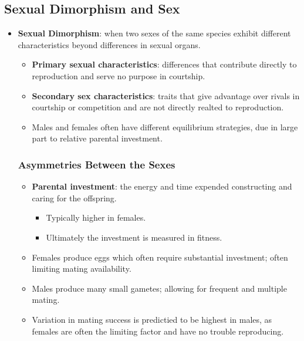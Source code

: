 \documentclass[12pt,a4paper]{article}
\begin{document}
\subsection{Sexual Dimorphism and Sex}
\begin{itemize}
    \item \textbf{Sexual Dimorphism}: when two sexes of the same species exhibit different characteristics beyond differences in sexual organs.
        \begin{itemize}
            \item \textbf{Primary sexual characteristics}: differences that contribute directly to reproduction and serve no purpose in courtship.
            \item \textbf{Secondary sex characteristics}: traits that give advantage over rivals in courtship or competition and are not directly realted to reproduction.
            \item Males and females often have different equilibrium strategies, due in large part to relative parental investment.
        \end{itemize}
    \subsubsection{Asymmetries Between the Sexes}
        \begin{itemize}
            \item \textbf{Parental investment}: the energy and time expended constructing and caring for the offspring.
                \begin{itemize}
                    \item Typically higher in females.
                    \item Ultimately the investment is measured in fitness.
                \end{itemize}
            \item Females produce eggs which often require substantial investment; often limiting mating availability.
            \item Males produce many small gametes; allowing for frequent and multiple mating.
            \item Variation in mating success is predictied to be highest in males, as females are often the limiting factor and have no trouble reproducing.
        \end{itemize}
\end{itemize}
\end{document}
